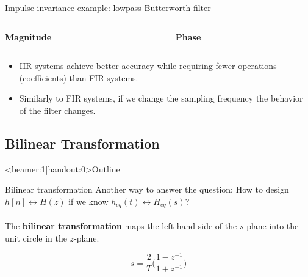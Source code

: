 \documentclass[10pt, handout]{beamer}
\begin{document}
%
\begin{frame}{Impulse invariance example: lowpass Butterworth filter}

\begin{columns}
	\begin{column}{0.5\textwidth}
		\textbf{Magnitude}
		\begin{center}
			\resizebox{\linewidth}{!}{}
		\end{center}
	\end{column}
	\begin{column}{0.5\textwidth}
		\textbf{Phase}
		\begin{center}
			\resizebox{\linewidth}{!}{}
		\end{center}
	\end{column}
\end{columns}

\begin{itemize}
	\item IIR systems achieve better accuracy while requiring fewer operations (coefficients) than FIR systems.
	\item Similarly to FIR systems, if we change the sampling frequency the behavior of the filter changes.
\end{itemize}
\end{frame}

%
\subsection{Bilinear Transformation}
\begin{frame}<beamer:1|handout:0>{Outline} 
\tableofcontents[currentsubsection]
\end{frame}

%
\begin{frame}{Bilinear transformation}
Another way to answer the question: How to design $h[n] \longleftrightarrow H(z)$ if we know $h_{eq}(t) \longleftrightarrow H_{eq}(s)$?
~\\
~\\

The \textbf{bilinear transformation} maps the left-hand side of the $s$-plane into the unit circle in the $z$-plane.
	
\begin{equation*}
	s = \frac{2}{T}\bigg(\frac{1 - z^{-1}}{1 + z^{-1}}\bigg) \tag{Bilinear transformation}
\end{equation*}

\begin{center}
	\resizebox{0.9\linewidth}{!}{}
\end{center}	
\end{frame}
\end{document}

